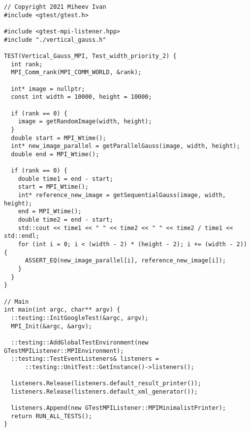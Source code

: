 \documentclass{report}
\begin{document}
\begin{lstlisting}
// Copyright 2021 Miheev Ivan
#include <gtest/gtest.h>

#include <gtest-mpi-listener.hpp>
#include "./vertical_gauss.h"

TEST(Vertical_Gauss_MPI, Test_width_priority_2) {
  int rank;
  MPI_Comm_rank(MPI_COMM_WORLD, &rank);

  int* image = nullptr;
  const int width = 10000, height = 10000;

  if (rank == 0) {
    image = getRandomImage(width, height);
  }
  double start = MPI_Wtime();
  int* new_image_parallel = getParallelGauss(image, width, height);
  double end = MPI_Wtime();

  if (rank == 0) {
    double time1 = end - start;
    start = MPI_Wtime();
    int* reference_new_image = getSequentialGauss(image, width, height);
    end = MPI_Wtime();
    double time2 = end - start;
    std::cout << time1 << " " << time2 << " " << time2 / time1 << std::endl;
    for (int i = 0; i < (width - 2) * (height - 2); i += (width - 2)) {
      ASSERT_EQ(new_image_parallel[i], reference_new_image[i]);
    }
  }
}

// Main
int main(int argc, char** argv) {
  ::testing::InitGoogleTest(&argc, argv);
  MPI_Init(&argc, &argv);

  ::testing::AddGlobalTestEnvironment(new GTestMPIListener::MPIEnvironment);
  ::testing::TestEventListeners& listeners =
      ::testing::UnitTest::GetInstance()->listeners();

  listeners.Release(listeners.default_result_printer());
  listeners.Release(listeners.default_xml_generator());

  listeners.Append(new GTestMPIListener::MPIMinimalistPrinter);
  return RUN_ALL_TESTS();
}
\end{lstlisting}
\end{document}
